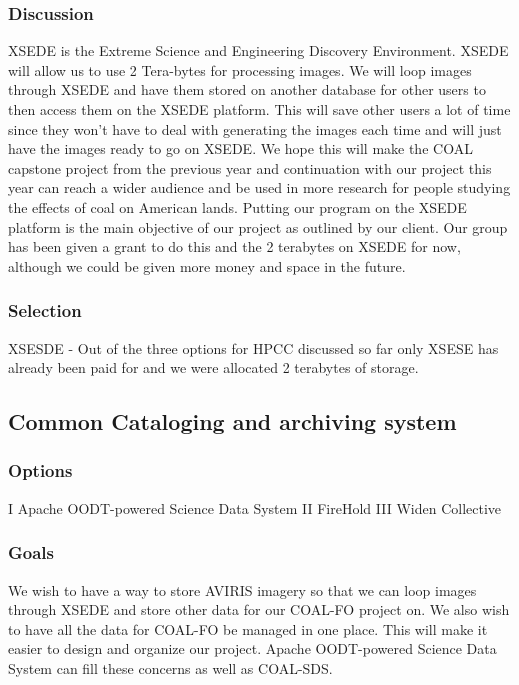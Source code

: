 \documentclass[10pt,draftclsnofoot,onecolumn,journal,compsoc]{IEEEtran}
\begin{document}
\subsubsection{Discussion}

\noindent XSEDE is the Extreme Science and Engineering Discovery Environment. XSEDE will allow us to use 2 Tera-bytes for processing images. We will loop images through XSEDE and have them stored on another database for other users to then access them on the XSEDE platform. This will save other users a lot of time since they won’t have to deal with generating the images each time and will just have the images ready to go on XSEDE. We hope this will make the COAL capstone project from the previous year and continuation with our project this year can reach a wider audience and be used in more research for people studying the effects of coal on American lands. Putting our program on the XSEDE platform is the main objective of our project as outlined by our client. Our group has been given a grant to do this and the 2 terabytes on XSEDE for now, although we could be given more money and space in the future.

\subsubsection{Selection}

\noindent XSESDE - Out of the three options for HPCC discussed so far only XSESE has already been paid for and we were allocated 2 terabytes of storage.

\subsection{Common Cataloging and archiving system}
\subsubsection{Options}
\noindent I Apache OODT-powered Science Data System
\noindent II FireHold
\noindent III Widen Collective

\subsubsection{Goals}
\noindent We wish to have a way to store AVIRIS imagery so that we can loop images through XSEDE and store other data for our COAL-FO project on. We also wish to have all the data for COAL-FO be managed in one place. This will make it easier to design and organize our project. Apache OODT-powered Science Data System can fill these concerns as well as COAL-SDS.
\end{document}
